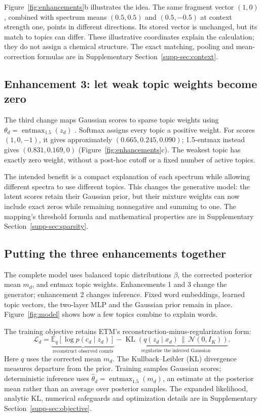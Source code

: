 \documentclass[10pt,a4paper]{article}
\newcommand{\entmax}{\operatorname{entmax}_{1.5}}
\newcommand{\KL}{\operatorname{KL}}
\begin{document}
Figure~\ref{fig:enhancements}b illustrates the idea. The same fragment vector
$(1,0)$, combined with spectrum means $(0.5,0.5)$ and $(0.5,-0.5)$ at context
strength one, points in different directions. Its stored vector is unchanged,
but its match to topics can differ. These illustrative coordinates explain
the calculation; they do not assign a chemical structure. The exact matching,
pooling and mean-correction formulas are in Supplementary
Section~\ref{supp-sec:context}.

\subsection{Enhancement 3: let weak topic weights become zero}

The third change maps Gaussian scores to sparse topic weights using
$\theta_d=\entmax(z_d)$ \cite{peters2019}. Softmax assigns every topic a
positive weight. For scores $(1,0,-1)$, it gives approximately
$(0.665,0.245,0.090)$; 1.5-entmax instead gives $(0.831,0.169,0)$
(Figure~\ref{fig:enhancements}c). The weakest topic has exactly zero weight,
without a post-hoc cutoff or a fixed number of active topics.

The intended benefit is a compact explanation of each spectrum while
allowing different spectra to use different topics. This changes the
generative model: the latent scores retain their Gaussian prior, but their
mixture weights can now include exact zeros while remaining nonnegative
and summing to one.
The mapping's threshold formula and mathematical properties are in
Supplementary Section~\ref{supp-sec:sparsity}.

\subsection{Putting the three enhancements together}
\label{sec:complete-model}

The complete model uses balanced topic distributions $\beta$, the corrected
posterior mean $m_d$, and entmax topic weights. Enhancements 1 and 3 change
the generator; enhancement 2 changes inference. Fixed word embeddings,
learned topic vectors, the two-layer MLP and the Gaussian prior remain in
place. Figure~\ref{fig:model} shows how a few topics combine to explain words.

The training objective retains ETM's reconstruction-minus-regularization form:
\begin{equation}
 \mathcal L_d=
 \underbrace{\mathbb E_q[\log p(c_d\mid z_d)]}_{\text{reconstruct observed counts}}
 -\underbrace{\KL(q(z_d\mid x_d)\,\|\,\mathcal N(0,I_K))}_{\text{regularize the inferred Gaussian}}.
 \label{eq:main-objective}
\end{equation}
Here $q$ uses the corrected mean $m_d$. The Kullback--Leibler (KL) divergence
measures departure from the prior. Training samples Gaussian scores;
deterministic inference uses $\widehat\theta_d=\entmax(m_d)$, an estimate at
the posterior mean rather than an average over posterior samples. The expanded
likelihood, analytic KL, numerical safeguards and optimization details are
in Supplementary Section~\ref{supp-sec:objective}.
\end{document}
